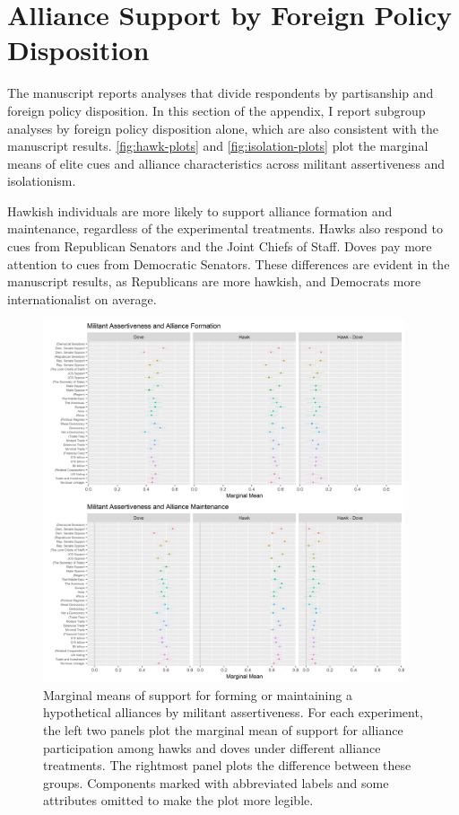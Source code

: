 \documentclass[12pt]{article}
\begin{document}
\section{Alliance Support by Foreign Policy Disposition} 


The manuscript reports analyses that divide respondents by partisanship and foreign policy disposition. 
In this section of the appendix, I report subgroup analyses by foreign policy disposition alone, which are also consistent with the manuscript results.
\autoref{fig:hawk-plots} and \autoref{fig:isolation-plots} plot the marginal means of elite cues and alliance characteristics across militant assertiveness and isolationism. 


Hawkish individuals are more likely to support alliance formation and maintenance, regardless of the experimental treatments. 
Hawks also respond to cues from Republican Senators and the Joint Chiefs of Staff. 
Doves pay more attention to cues from Democratic Senators.
These differences are evident in the manuscript results, as Republicans are more hawkish, and Democrats more internationalist on average. 


\begin{figure}
	\centering
		\includegraphics[width=0.95\textwidth]{hawk-plots.png}
	\caption{Marginal means of support for forming or maintaining a hypothetical alliances by militant assertiveness. For each experiment, the left two panels plot the marginal mean of support for alliance participation among hawks and doves under different alliance treatments. The rightmost panel plots the difference between these groups. Components marked with abbreviated labels and some attributes omitted to make the plot more legible.}
	\label{fig:hawk-plots}
\end{figure}
\end{document}
